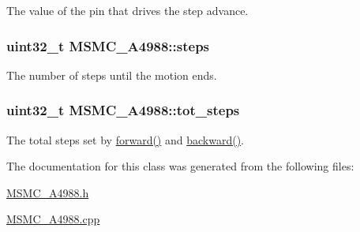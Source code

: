 The value of the pin that drives the step advance. 

\hypertarget{class_m_s_m_c___a4988_aa85fc95facc940db652cd2f545f033cd}{
\subsubsection[{steps}]{\setlength{\rightskip}{0pt plus 5cm}uint32\+\_\+t M\+S\+M\+C\+\_\+\+A4988\+::steps\hspace{0.3cm}{\ttfamily [private]}}}\label{class_m_s_m_c___a4988_aa85fc95facc940db652cd2f545f033cd}


The number of steps until the motion ends. 

\hypertarget{class_m_s_m_c___a4988_aa7de83eb15a9f82533b898146921939b}{
\subsubsection[{tot\+\_\+steps}]{\setlength{\rightskip}{0pt plus 5cm}uint32\+\_\+t M\+S\+M\+C\+\_\+\+A4988\+::tot\+\_\+steps\hspace{0.3cm}{\ttfamily [private]}}}\label{class_m_s_m_c___a4988_aa7de83eb15a9f82533b898146921939b}


The total steps set by \hyperlink{class_m_s_m_c___a4988_a9acdbabf546656a6436e89579e8fcfca}{forward()} and \hyperlink{class_m_s_m_c___a4988_a836bed9e28e723ead2a94446bb704869}{backward()}. 



The documentation for this class was generated from the following files\+:\begin{DoxyCompactItemize}
\item 
\hyperlink{_m_s_m_c___a4988_8h}{M\+S\+M\+C\+\_\+\+A4988.\+h}\item 
\hyperlink{_m_s_m_c___a4988_8cpp}{M\+S\+M\+C\+\_\+\+A4988.\+cpp}\end{DoxyCompactItemize}
